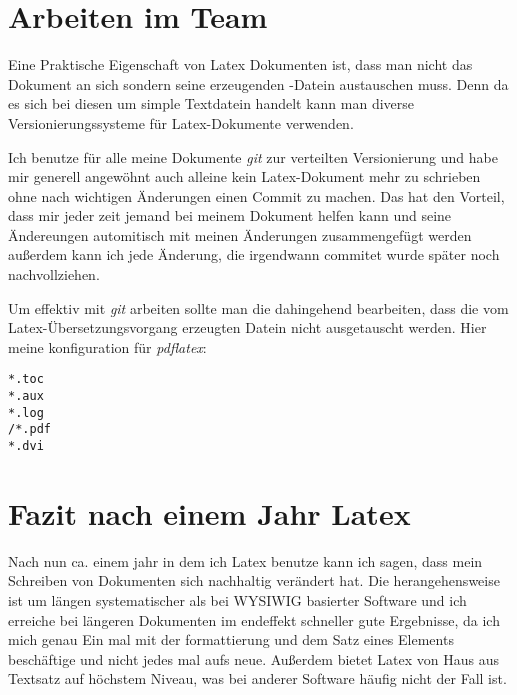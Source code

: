 \section{Arbeiten im Team}
Eine Praktische Eigenschaft von Latex Dokumenten ist, dass man nicht das Dokument an sich sondern seine erzeugenden
-Datein austauschen muss. Denn da es sich bei diesen um simple Textdatein handelt kann man diverse
Versionierungssysteme für Latex-Dokumente verwenden. 

Ich benutze für alle meine Dokumente \textit{git} zur verteilten Versionierung und habe mir generell angewöhnt
auch alleine kein Latex-Dokument mehr zu schrieben ohne nach wichtigen Änderungen einen Commit zu machen. Das hat
den Vorteil, dass mir jeder zeit jemand bei meinem Dokument helfen kann und seine Ändereungen automitisch mit
meinen Änderungen zusammengefügt werden außerdem kann ich jede Änderung, die irgendwann commitet wurde später noch
nachvollziehen.

Um effektiv mit \textit{git} arbeiten sollte man die  dahingehend bearbeiten, dass die vom
Latex-Übersetzungsvorgang erzeugten Datein nicht ausgetauscht werden. Hier meine konfiguration für
\textit{pdflatex}:
\begin{verbatim}
*.toc
*.aux
*.log
/*.pdf
*.dvi
\end{verbatim}

\section{Fazit nach einem Jahr Latex}
Nach nun ca. einem jahr in dem ich Latex benutze kann ich sagen, dass mein Schreiben von Dokumenten sich nachhaltig
verändert hat. Die herangehensweise ist um längen systematischer als bei WYSIWIG basierter Software und ich
erreiche bei längeren Dokumenten im endeffekt schneller gute Ergebnisse, da ich mich genau Ein mal mit der
formattierung und dem Satz eines Elements beschäftige und nicht jedes mal aufs neue. Außerdem bietet Latex
von Haus aus Textsatz auf höchstem Niveau, was bei anderer Software häufig nicht der Fall ist.

